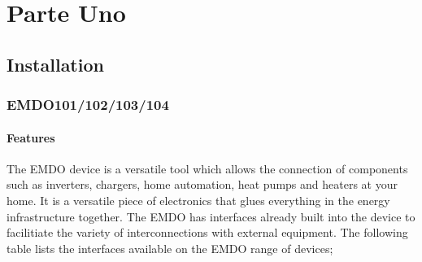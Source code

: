 \documentclass[11pt,fleqn]{book} %
\numberwithin{equation}{section} %
\numberwithin{figure}{section} %
\numberwithin{table}{section} %
\begin{document}




\pagestyle{empty} %

 \tableofcontents %

\cleardoublepage %

\pagestyle{fancy} %


\part{Parte Uno}



\chapter{Installation}

\section*{EMDO101/102/103/104}
\subsection*{ Features}

The EMDO device is a versatile tool which allows the connection of components such as inverters, chargers, home automation, heat pumps and heaters at your home. It is a versatile piece of electronics that glues everything in the energy infrastructure together.
The EMDO has interfaces already built into the device to facilitiate the variety of interconnections with external equipment. The following table lists the interfaces available on the EMDO range of devices;
\end{document}
